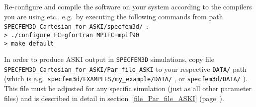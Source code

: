 \documentclass[12pt,a4paper]{article}
\newcommand{\lcode}[1]{\nolinkurl{#1}}
\newcommand{\ASKI}{ {\ttfamily ASKI} }
\newcommand{\myref}[1]{\ref{#1} (page~\pageref{#1})}
\begin{document}
Re-configure and compile the software on your system according to the compilers you are using etc., e.g.\ 
by executing the following commands from path \lcode{SPECFEM3D_Cartesian_for_ASKI/specfem3d/}~:\\
\lcode{> ./configure FC=gfortran MPIFC=mpif90}\\
\lcode{> make default}

In order to produce \ASKI{} output in \lcode{SPECFEM3D} simulations, copy file 
\lcode{SPECFEM3D_Cartesian_for_ASKI/Par_file_ASKI} to your respective \lcode{DATA/} path
(which is e.g.\ \lcode{specfem3d/EXAMPLES/my_example/DATA/} , or \lcode{specfem3d/DATA/} ). This 
file must be adjusted for any specific simulation (just as all other parameter files) and is described in 
detail in section~\myref{file_Par_file_ASKI}.


\end{document}
